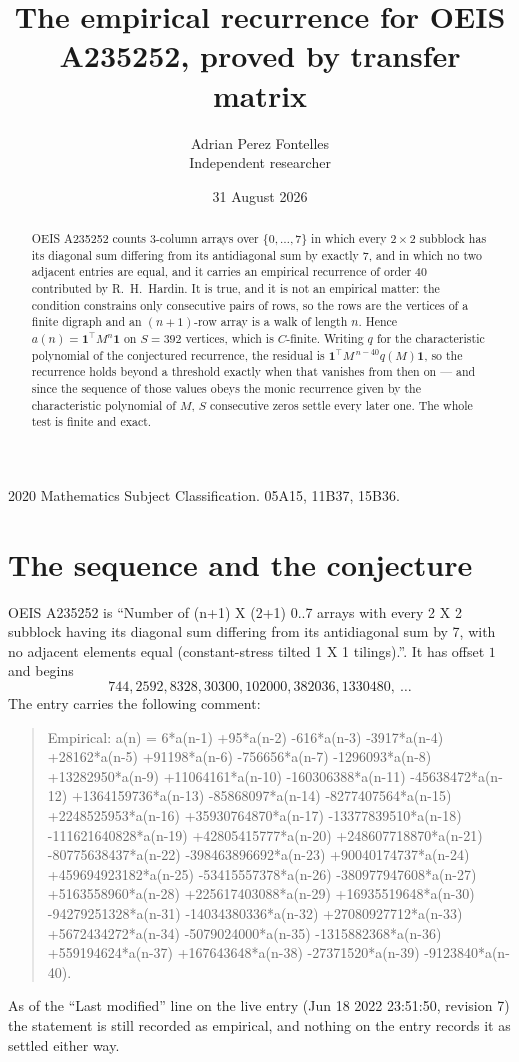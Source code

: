 \documentclass[11pt,a4paper]{article}
\title{The empirical recurrence for OEIS A235252, proved by transfer matrix}
\author{Adrian Perez Fontelles\\ \small Independent researcher}
\date{31 August 2026}
\theoremstyle{plain}
\theoremstyle{definition}
\begin{document}
\maketitle

\begin{abstract}
OEIS A235252 counts $3$-column arrays over $\{0,\dots,7\}$ in which every
$2\times2$ subblock has its diagonal sum differing from its antidiagonal sum by
exactly $7$, and in which no two adjacent entries are equal, and it
carries an empirical recurrence of order $40$ contributed by R.~H.~Hardin. It is true,
and it is not an empirical matter: the condition constrains only consecutive pairs of rows,
so the rows are the vertices of a finite digraph and an $(n+1)$-row array is a walk of
length $n$. Hence $a(n)=\mathbf{1}^{\!\top}M^{n}\mathbf{1}$ on $S=392$ vertices, which
is $C$-finite. Writing $q$ for the characteristic polynomial of the conjectured recurrence,
the residual is $\mathbf{1}^{\!\top}M^{\,n-40}q(M)\mathbf{1}$, so the recurrence
holds beyond a threshold exactly when that vanishes from then on --- and since the sequence
of those values obeys the monic recurrence given by the characteristic polynomial of $M$,
$S$ consecutive zeros settle every later one. The whole test is finite and exact.
\end{abstract}

\noindent\small 2020 Mathematics Subject Classification. 05A15, 11B37, 15B36.\normalsize

\section{The sequence and the conjecture}

OEIS A235252 is ``Number of (n+1) X (2+1) 0..7 arrays with every 2 X 2 subblock having its diagonal sum differing from its antidiagonal sum by 7, with no adjacent elements equal (constant-stress tilted 1 X 1 tilings).''. It has offset
$1$ and begins
\[
744, 2592, 8328, 30300, 102000, 382036, 1330480,\ \dots
\]
The entry carries the following comment:
\begin{quote}\small
Empirical: a(n) = 6*a(n-1) +95*a(n-2) -616*a(n-3) -3917*a(n-4) +28162*a(n-5) +91198*a(n-6) -756656*a(n-7) -1296093*a(n-8) +13282950*a(n-9) +11064161*a(n-10) -160306388*a(n-11) -45638472*a(n-12) +1364159736*a(n-13) -85868097*a(n-14) -8277407564*a(n-15) +2248525953*a(n-16) +35930764870*a(n-17) -13377839510*a(n-18) -111621640828*a(n-19) +42805415777*a(n-20) +248607718870*a(n-21) -80775638437*a(n-22) -398463896692*a(n-23) +90040174737*a(n-24) +459694923182*a(n-25) -53415557378*a(n-26) -380977947608*a(n-27) +5163558960*a(n-28) +225617403088*a(n-29) +16935519648*a(n-30) -94279251328*a(n-31) -14034380336*a(n-32) +27080927712*a(n-33) +5672434272*a(n-34) -5079024000*a(n-35) -1315882368*a(n-36) +559194624*a(n-37) +167643648*a(n-38) -27371520*a(n-39) -9123840*a(n-40).
\end{quote}
As of the ``Last modified'' line on the live entry (Jun 18 2022 23:51:50, revision 7) the statement is
still recorded as empirical, and nothing on the entry records it as settled either way.
\end{document}

